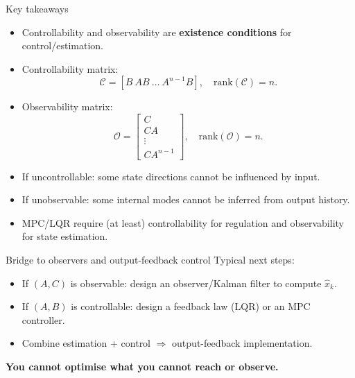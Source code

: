 \documentclass[aspectratio=169,10pt]{beamer}
\newcommand{\Ccal}{\mathcal{C}}
\newcommand{\Ocal}{\mathcal{O}}
\begin{document}
\begin{frame}{Key takeaways}
\begin{itemize}
  \item Controllability and observability are \textbf{existence conditions} for control/estimation.
  \item Controllability matrix:
  \[
  \Ccal=[B\ AB\ \dots\ A^{n-1}B],\quad \mathrm{rank}(\Ccal)=n.
  \]
  \item Observability matrix:
  \[
  \Ocal=\begin{bmatrix}C\\CA\\\vdots\\CA^{n-1}\end{bmatrix},\quad \mathrm{rank}(\Ocal)=n.
  \]
  \item If uncontrollable: some state directions cannot be influenced by input.
  \item If unobservable: some internal modes cannot be inferred from output history.
  \item MPC/LQR require (at least) controllability for regulation and observability for state estimation.
\end{itemize}
\end{frame}

\begin{frame}{Bridge to observers and output-feedback control}
Typical next steps:
\begin{itemize}
  \item If \((A,C)\) is observable: design an observer/Kalman filter to compute \(\hat{x}_k\).
  \item If \((A,B)\) is controllable: design a feedback law (LQR) or an MPC controller.
  \item Combine estimation + control \(\Rightarrow\) output-feedback implementation.
\end{itemize}

\begin{center}
\textbf{You cannot optimise what you cannot reach or observe.}
\end{center}
\end{frame}
\end{document}
